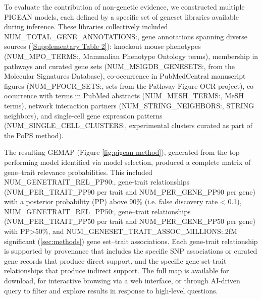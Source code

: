 To evaluate the contribution of non-genetic evidence, we constructed multiple PIGEAN models, each defined by a specific set of geneset libraries available during inference. These libraries collectively included {{NUM_TOTAL_GENE_ANNOTATIONS:,}} gene annotations spanning diverse sources (\ref{Supplementary Table 2}): knockout mouse phenotypes ({{NUM_MPO_TERMS:,}} Mammalian Phenotype Ontology terms), membership in pathways and curated gene sets ({{NUM_MSIGDB_GENESETS:,}} from the Molecular Signatures Database), co-occurrence in PubMedCentral manuscript figures ({{NUM_PFOCR_SETS:,}} sets from the Pathway Figure OCR project), co-occurrence with terms in PubMed abstracts ({{NUM_MESH_TERMS:,}} MeSH terms), network interaction partners ({{NUM_STRING_NEIGHBORS:,}} STRING neighbors), and single-cell gene expression patterns ({{NUM_SINGLE_CELL_CLUSTERS:,}} experimental clusters curated as part of the PoPS method).  

The resulting GEMAP (Figure \ref{fig:pigean-method}), generated from the top-performing model identified via model selection, produced a complete matrix of gene–trait relevance probabilities. This included {{NUM_GENETRAIT_REL_PP90:,}} gene-trait relationships ({{NUM_PER_TRAIT_PP90}} per trait and {{NUM_PER_GENE_PP90}} per gene) with a posterior probability (PP) above 90\% (i.e. false discovery rate < 0.1), {{NUM_GENETRAIT_REL_PP50:,}} gene–trait relationships ({{NUM_PER_TRAIT_PP50}} per trait and {{NUM_PER_GENE_PP50}} per gene) with PP>50\%, and {{NUM_GENESET_TRAIT_ASSOC_MILLIONS:.2f}}M significant (\ref{sec:methods}) gene set–trait associations. Each gene-trait relationship is supported by provenance that includes the specific SNP associations or curated gene records that produce direct support, and the specific gene set-trait relationships that produce indirect support. The full map is available for download, for interactive browsing via a web interface, or through AI-driven query to filter and explore results in response to high-level questions.  